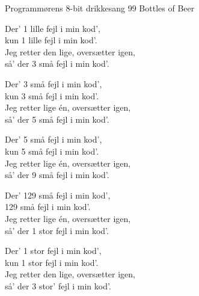 \begin{song}{Programmørens 8-bit drikkesang}
  {} %
  {99 Bottles of Beer} %
  {} %
  {} %
  {\NotCCLIed} %

  \begin{SBVerse}
    Der' 1 lille fejl i min kod',\\
    kun 1 lille fejl i min kod'.\\
    Jeg retter den lige, oversætter igen,\\
    så' der 3 små fejl i min kod'.
  \end{SBVerse}

  \begin{SBVerse}
    Der' 3 små fejl i min kod',\\
    kun 3 små fejl i min kod'.\\
    Jeg retter lige én, oversætter igen,\\
    så' der 5 små fejl i min kod'.
  \end{SBVerse}

  \begin{SBVerse}
    Der' 5 små fejl i min kod',\\
    kun 5 små fejl i min kod'.\\
    Jeg retter lige én, oversætter igen,\\
    så' der 9 små fejl i min kod'.
  \end{SBVerse}

  \begin{SBVerse}
    Der' 129 små fejl i min kod',\\
    129 små fejl i min kod'.\\
    Jeg retter lige én, oversætter igen,\\
    så' der 1 stor fejl i min kod'.
  \end{SBVerse}

  \begin{SBVerse}
    Der' 1 stor fejl i min kod',\\
    kun 1 stor fejl i min kod'.\\
    Jeg retter den lige, oversætter igen,\\
    så' der 3 stor' fejl i min kod'.
  \end{SBVerse}


\end{song}
